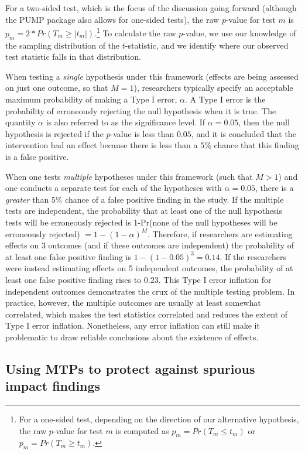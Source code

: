 \documentclass[
]{article}
\begin{document}
For a two-sided test, which is the focus of the discussion going forward
(although the PUMP package also allows for one-sided tests), the raw
\(p\)-value for test \(m\) is
\(p_m=2*Pr(T_m \geq |t_m|)\).\footnote{For a one-sided test, depending on the direction of our alternative hypothesis, the raw $p$-value for test $m$ is computed as $p_m=Pr(T_m \leq t_m)$ or $p_m=Pr(T_m \geq t_m)$.}
To calculate the raw \(p\)-value, we use our knowledge of the sampling
distribution of the \(t\)-statistic, and we identify where our observed
test statistic falls in that distribution.

When testing a \emph{single} hypothesis under this framework (effects
are being assessed on just one outcome, so that \(M=1\)), researchers
typically specify an acceptable maximum probability of making a Type I
error, \(\alpha\). A Type I error is the probability of erroneously
rejecting the null hypothesis when it is true. The quantity \(\alpha\)
is also referred to as the significance level. If \(\alpha=0.05\), then
the null hypothesis is rejected if the \(p\)-value is less than
\(0.05\), and it is concluded that the intervention had an effect
because there is less than a \(5\)\% chance that this finding is a false
positive.

When one tests \emph{multiple} hypotheses under this framework (such
that \(M>1\)) and one conducts a separate test for each of the
hypotheses with \(\alpha=0.05\), there is a \emph{greater} than \(5\%\)
chance of a false positive finding in the study. If the multiple tests
are independent, the probability that at least one of the null
hypothesis tests will be erroneously rejected is 1-Pr(none of the null
hypotheses will be erroneously rejected) \(= 1-(1-\alpha)^M\).
Therefore, if researchers are estimating effects on 3 outcomes (and if
these outcomes are independent) the probability of at least one false
positive finding is \(1-(1-0.05)^3=0.14\). If the researchers were
instead estimating effects on 5 independent outcomes, the probability of
at least one false positive finding rises to \(0.23\). This Type I error
inflation for independent outcomes demonstrates the crux of the multiple
testing problem. In practice, however, the multiple outcomes are usually
at least somewhat correlated, which makes the test statistics correlated
and reduces the extent of Type I error inflation. Nonetheless, any error
inflation can still make it problematic to draw reliable conclusions
about the existence of effects.

\subsection{Using MTPs to protect against spurious impact findings}
\label{sec:mtp_use}
\end{document}
